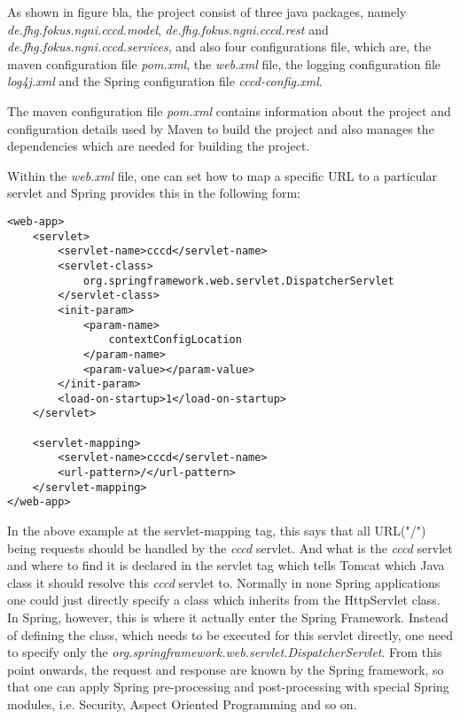 As shown in figure bla, the project consist of three java packages, namely \textit{de.fhg.fokus.ngni.cccd.model}, 	\textit{de.fhg.fokus.ngni.cccd.rest} and \textit{de.fhg.fokus.ngni.cccd.services}, and also four configurations file, which are, the maven configuration file \textit{pom.xml}, the \textit{web.xml} file, the logging configuration file \textit{log4j.xml} and the Spring configuration file \textit{cccd-config.xml}.

The maven configuration file \textit{pom.xml} contains information about the project and configuration details used by Maven to build the project and also manages the dependencies which are needed for building the project.

Within the \textit{web.xml} file, one can set how to map a specific URL to a particular servlet and Spring provides this in the following form:

\begin{code}
\begin{verbatim}
<web-app>
	<servlet>
		<servlet-name>cccd</servlet-name>
		<servlet-class>
			org.springframework.web.servlet.DispatcherServlet
		</servlet-class>
		<init-param>
			<param-name>
				contextConfigLocation
			</param-name>
			<param-value></param-value>
		</init-param>
		<load-on-startup>1</load-on-startup>
	</servlet>

	<servlet-mapping>
		<servlet-name>cccd</servlet-name>
		<url-pattern>/</url-pattern>
	</servlet-mapping>
</web-app>
\end{verbatim}
\end{code}

In the above example at the servlet-mapping tag, this says that all URL("/") being requests should be handled by the \textit{cccd} servlet.  And what is the \textit{cccd} servlet and where to find it is declared in the servlet tag which tells Tomcat which Java class it should resolve this \textit{cccd} servlet to. Normally in none Spring applications one could just directly specify a class which inherits from the HttpServlet class. In Spring, however, this is where it actually enter the Spring Framework.  Instead of defining the class, which needs to be executed for this servlet directly, one need to specify only the \textit{org.springframework.web.servlet.DispatcherServlet}. From this point onwards, the request and response are known by the Spring framework, so that one can apply Spring pre-processing and post-processing with special Spring modules, i.e. Security, Aspect Oriented Programming and so on.




